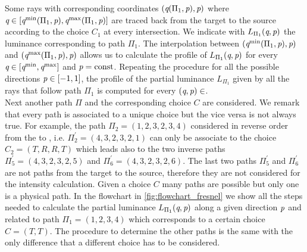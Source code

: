 Some rays with corresponding coordinates $(\textit{q}(\Pi_1, \textit{p}), \textit{p})$ where 
$\textit{q}\in[\textit{q}^{\textrm{min}}(\Pi_1, \textit{p}), \textit{q}^{\textrm{max}}(\Pi_1, \textit{p})]$ are traced back from the target to the source according to the choice $C_1$ at every intersection.
We indicate with $L_{\Pi_1}(\textit{q},\textit{p})$ the luminance corresponding to path $\Pi_1$. The interpolation between 
$(\textit{q}^{\textrm{min}}(\Pi_1, \textit{p}), \textit{p})$ and $(\textit{q}^{\textrm{max}}(\Pi_1, \textit{p}), \textit{p})$ allows us to calculate the profile of $L_{\Pi_1}(\textit{q},\textit{p})$ for every $\textit{q}\in[\textit{q}^{\textrm{min}}, \textit{q}^{\textrm{max}}]$ and $\textit{p}=\textrm{const}$.
Repeating the procedure for all the possible directions $\textit{p}\in[-1,1]$, the profile of the partial luminance $L_{\Pi_1}$ given by all the rays that follow path $\Pi_1$ is computed for every $(\textit{q}, \textit{p})\in$. 
\\ \indent Next another path $\Pi$ and the corresponding choice $C$ are considered. We remark that every path is associated to a unique choice but the vice versa is not always true. For example, the path $\Pi_2 = (1,2,3,2,3,4)$ considered in reverse order from the  to , i.e. $\Pi_2^{\prime} = (4,3,2,3,2,1)$ can only be associate to the choice $C_2 = (T,R,R,T)$ which leads also to the two inverse paths $\Pi_5^{\prime}= (4,3,2,3,2,5)$ and $\Pi_6^{\prime}= (4,3,2,3,2,6)$. The last two paths $\Pi_5^{\prime}$ and $\Pi_6^{\prime}$ are not paths from the target to the source, therefore they are not considered for the intensity calculation. Given a choice $C$ many paths are possible but only one is a physical path. In the flowchart in \ref{fig:flowchart_fresnel} we show all the steps needed to calculate the partial luminance $L_{\Pi_1}(\textit{q}, \textit{p})$  along a given direction $\textit{p}$ and related to path $\Pi_1 = (1,2,3,4)$ which corresponds to a certain choice $C= (T,T)$. The procedure to determine the other paths is the same with the only difference that a different choice has to be considered.
